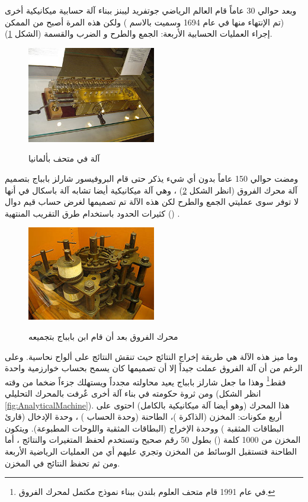 \documentclass[document.tex]{subfiles}
\begin{document}
وبعد حوالي 30 عاماً قام العالم الرياضي جوتفريد ليبنز  ببناء آلة حسابية ميكانيكية أخرى (تم الإنتهاء منها في عام 1694 وسميت بالاسم ) ولكن هذه المرة أصبح من الممكن إجراء العمليات الحسابية الأربعة: الجمع والطرح و الضرب والقسمة (الشكل \ref{fig:Leibnitzrechenmaschine}).
\begin{figure}[h!] 
  \caption{آلة   في متحف بألمانيا}
  \centering
   \includegraphics[width=0.5\textwidth]{../img/Leibnitzrechenmaschine}
 \label{fig:Leibnitzrechenmaschine} 
\end{figure}
 ومضت حوالي 150 عاماً بدون أي شيء يذكر حتى قام البروفيسور شارلز بابباج  بتصميم آلة محرك الفروق  (انظر الشكل \ref{fig:DifferenceEngine}) ، وهي آلة ميكانيكية أيضا تشابه آلة باسكال في أنها لا توفر سوى عمليتي الجمع والطرح لكن هذه الآلة تم تصميمها لغرض حساب قيم دوال كثيرات الحدود باستخدام طرق التقريب المنتهية () .
\begin{figure}[h!] 
  \caption{محرك الفروق بعد أن قام ابن بابباج بتجميعه}
  \centering
   \includegraphics[width=0.5\textwidth]{../img/BabbageDifferenceEngine}
 \label{fig:DifferenceEngine} 
\end{figure}
وما ميز هذه الآلة هي طريقة إخراج النتائج حيث تنقش النتائج على ألواح نحاسية. وعلى الرغم من أن آلة الفروق عملت جيداً إلا أن تصميمها كان يسمح بحساب خوارزمية واحدة فقط\footnote{في عام 1991 قام متحف العلوم بلندن ببناء نموذج مكتمل لمحرك الفروق.} وهذا ما جعل شارلز بابباج يعيد محاولته مجدداً ويستهلك جزءاً ضخما من وقته ومن ثروة حكومته في بناء آلة أخرى عٌرفت بالمحرك التحليلي  (انظر الشكل \ref{fig:AnalyticalMachine}). هذا المحرك (وهو أيضا آلة ميكانيكية بالكامل) احتوى على أربع مكونات: المخزن (الذاكرة )، الطاحنة (وحدة الحساب ) ، وحدة الإدخال (قارئ البطاقات المثقبة ) ووحدة الإخراج (البطاقات المثقبة واللوحات المطبوعة).  ويتكون المخزن من 1000 كلمة () بطول 50 رقم صحيح وتستخدم لحفظ المتغيرات والنتائج ، أما الطاحنة فتستقبل الوسائط من المخزن وتجري عليهم أي من العمليات الرياضية الأربعة ومن ثم تحفظ النتائج في المخزن.
\end{document}

